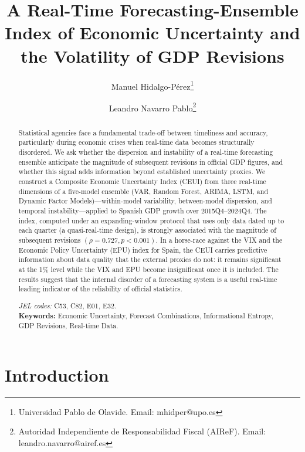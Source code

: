 \documentclass[12pt,a4paper]{article}
\theoremstyle{remark}
\begin{document}
\title{A Real-Time Forecasting-Ensemble Index of Economic Uncertainty and the Volatility of GDP Revisions}
\author{Manuel Hidalgo-Pérez\thanks{Universidad Pablo de Olavide. Email: mhidper@upo.es} \and Leandro Navarro Pablo\thanks{Autoridad Independiente de Responsabilidad Fiscal (AIReF). Email: leandro.navarro@airef.es}}
\date{}

\maketitle

\begin{abstract}
Statistical agencies face a fundamental trade-off between timeliness and accuracy, particularly during economic crises when real-time data becomes structurally disordered. We ask whether the dispersion and instability of a real-time forecasting ensemble anticipate the magnitude of subsequent revisions in official GDP figures, and whether this signal adds information beyond established uncertainty proxies. We construct a Composite Economic Uncertainty Index (CEUI) from three real-time dimensions of a five-model ensemble (VAR, Random Forest, ARIMA, LSTM, and Dynamic Factor Models)---within-model variability, between-model dispersion, and temporal instability---applied to Spanish GDP growth over 2015Q4--2024Q4. The index, computed under an expanding-window protocol that uses only data dated up to each quarter (a quasi-real-time design), is strongly associated with the magnitude of subsequent revisions $(\rho = 0.727, p < 0.001)$. In a horse-race against the VIX and the Economic Policy Uncertainty (EPU) index for Spain, the CEUI carries predictive information about data quality that the external proxies do not: it remains significant at the 1\% level while the VIX and EPU become insignificant once it is included. The results suggest that the internal disorder of a forecasting system is a useful real-time leading indicator of the reliability of official statistics.

\vspace{0.5cm}
\noindent\textit{JEL codes:} C53, C82, E01, E32.\\
\textbf{Keywords:} Economic Uncertainty, Forecast Combinations, Informational Entropy, GDP Revisions, Real-time Data.
\end{abstract}


\section{Introduction}
\end{document}
